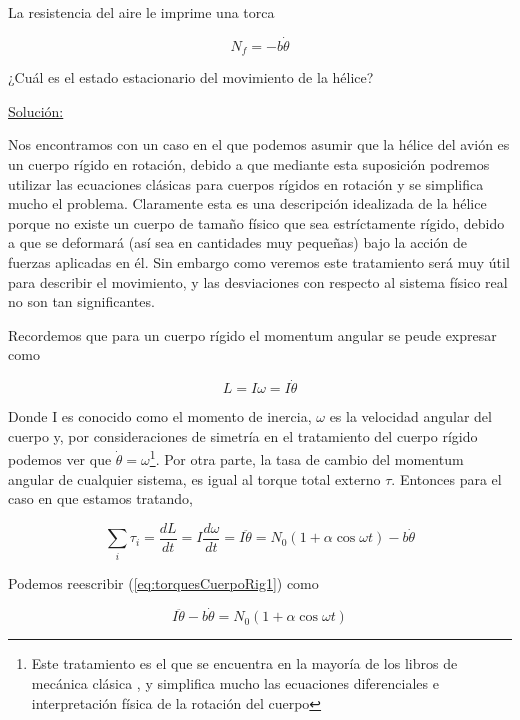 \documentclass[a4paper,10pt]{article}
\numberwithin{equation}{section}
\begin{document}
La resistencia del aire le imprime una torca

$$N_f = -b\dot{\theta}$$

¿Cuál es el estado estacionario del movimiento de la hélice?

\vspace{.3cm}

\underline{Solución:}

Nos encontramos con un caso en el que podemos asumir que la hélice del avión es un
cuerpo rígido en rotación, debido a que mediante esta suposición podremos utilizar
las ecuaciones clásicas para cuerpos rígidos en rotación y se simplifica mucho el
problema. Claramente esta es una descripción idealizada de la hélice porque no 
existe un cuerpo de tamaño físico que sea estríctamente rígido, debido a que se
deformará (así sea en cantidades muy pequeñas) bajo la acción de fuerzas aplicadas
en él. Sin embargo como veremos este tratamiento será muy útil para describir el
movimiento, y las desviaciones con respecto al sistema físico real no son tan 
significantes.

Recordemos que para un cuerpo rígido el momentum angular se peude expresar como

\begin{equation}
 L = I\omega = I\dot{\theta}
 \label{eq:MomemtumAngCuerpoRig}
\end{equation}

Donde I es conocido como el momento de inercia, $\omega$ es la velocidad angular
del cuerpo y, por consideraciones de simetría en el tratamiento del cuerpo
rígido podemos ver que $\dot{\theta} = \omega$\footnote{Este tratamiento es el que
se encuentra en la mayoría de los libros de mecánica clásica \cite{marion,arya}, y simplifica mucho
las ecuaciones diferenciales e interpretación física de la rotación del cuerpo}. Por
otra parte, la tasa de cambio del momentum angular de cualquier sistema, es igual
al torque total externo $\tau$. Entonces para el caso en que estamos tratando,

\begin{equation}
 \sum_i \tau_i = \frac{dL}{dt} = I \frac{d\omega}{dt} = I \ddot{\theta} 
 = N_0(1+\alpha \cos{\omega t}) - b\dot{\theta}
 \label{eq:torquesCuerpoRig1}
\end{equation}

Podemos reescribir (\ref{eq:torquesCuerpoRig1}) como

\begin{equation}
 I\ddot{\theta} - b\dot{\theta} = N_0(1+\alpha \cos{\omega t})
 \label{eq:torquesCuerpoRig2}
\end{equation}
\end{document}
